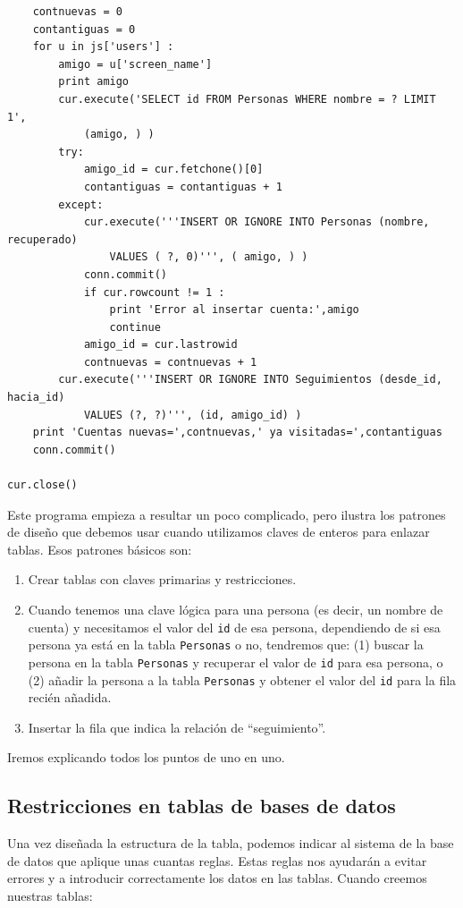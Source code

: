 \begin{verbatim}
    contnuevas = 0
    contantiguas = 0
    for u in js['users'] :
        amigo = u['screen_name']
        print amigo
        cur.execute('SELECT id FROM Personas WHERE nombre = ? LIMIT 1', 
            (amigo, ) )
        try:
            amigo_id = cur.fetchone()[0]
            contantiguas = contantiguas + 1
        except:
            cur.execute('''INSERT OR IGNORE INTO Personas (nombre, recuperado) 
                VALUES ( ?, 0)''', ( amigo, ) )
            conn.commit()
            if cur.rowcount != 1 :
                print 'Error al insertar cuenta:',amigo
                continue
            amigo_id = cur.lastrowid
            contnuevas = contnuevas + 1
        cur.execute('''INSERT OR IGNORE INTO Seguimientos (desde_id, hacia_id) 
            VALUES (?, ?)''', (id, amigo_id) )
    print 'Cuentas nuevas=',contnuevas,' ya visitadas=',contantiguas
    conn.commit()

cur.close()
\end{verbatim}
\afterverb
%
Este programa empieza a resultar un poco complicado, pero ilustra
los patrones de diseño que debemos usar cuando utilizamos
claves de enteros para enlazar tablas. Esos patrones básicos son:

\begin{enumerate}

\item Crear tablas con claves primarias y restricciones.

\item Cuando tenemos una clave lógica para una persona (es decir, un
nombre de cuenta) y necesitamos el valor del {\tt id} de esa persona,
dependiendo de si esa persona ya está en la tabla
{\tt Personas} o no, tendremos que:
(1) buscar la persona en la tabla {\tt Personas} y
recuperar el valor de {\tt id} para esa persona,
o (2) añadir la persona a la tabla {\tt Personas} y obtener el
valor del {\tt id} para la fila recién añadida.

\item Insertar la fila que indica la relación de ``seguimiento''.

\end{enumerate}

Iremos explicando todos los puntos de uno en uno.

\subsection{Restricciones en tablas de bases de datos}

Una vez diseñada la estructura de la tabla, podemos indicar al sistema
de la base de datos que aplique unas cuantas reglas. Estas reglas nos
ayudarán a evitar errores y a introducir correctamente los datos en
las tablas. Cuando creemos nuestras tablas:


